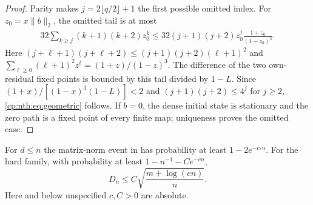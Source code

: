 \begin{proof}
Parity makes \(j=2\lfloor q/2\rfloor+1\) the first possible omitted
index. For \(z_0=x\|b\|_2\), the omitted tail is at most
\[\begin{gathered}
32\sum_{k\ge j}(k+1)(k+2)z_0^k
\le32(j+1)(j+2)z_0^j\frac{1+z_0}{(1-z_0)^3}.
\end{gathered}\] Here
\((j+\ell+1)(j+\ell+2)\le(j+1)(j+2)(\ell+1)^2\)
and
\(\sum_{\ell\ge0}(\ell+1)^2z^\ell=(1+z)/(1-z)^3\).
The difference of the two own-residual fixed points is bounded by this
tail divided by \(1-L\). Since \((1+x)/[(1-x)^3(1-L)]<2\) and
\((j+1)(j+2)\le4^j\) for \(j\ge2\),
\eqref{cp:nth:eq:geometric} follows. If \(b=0\), the dense
initial state is stationary and the zero path is a fixed point of every
finite map; uniqueness proves the omitted case.
\end{proof}

\begin{lemma}\label{cp:nth:gaussian-control}

For \(d\le n\) the matrix-norm event in
 has probability at least
\(1-2e^{-c_*n}\). For the hard family, with probability at least
\(1-n^{-1}-Ce^{-cn}\),
\begin{equation}\label{cp:nth:eq:dense-upper}{
D_n\le C\sqrt{\frac{m+\log(en)}n}.
}\end{equation} Here and below unspecified \(c,C>0\) are absolute.

\end{lemma}

\label{cp:nth:proof:gaussian-control}{}

